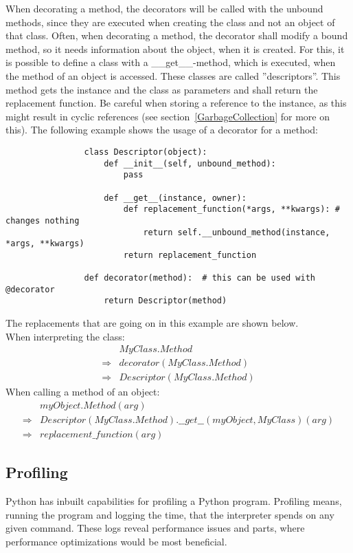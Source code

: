 			When decorating a method, the decorators will be called with the unbound methods, since they are executed when creating the class and not an object of that class.
			Often, when decorating a method, the decorator shall modify a bound method, so it needs information about the object, when it is created.
			For this, it is possible to define a class with a {\normalfont \ttfamily \_\_get\_\_}-method, which is executed, when the method of an object is accessed.
			These classes are called ''descriptors''.
			This method gets the instance and the class as parameters and shall return the replacement function.
			Be careful when storing a reference to the instance, as this might result in cyclic references (see section~\ref{GarbageCollection} for more on this).
			The following example shows the usage of a decorator for a method:
			\begin{verbatim}
				class Descriptor(object):
					def __init__(self, unbound_method):
						pass

					def __get__(instance, owner):
						def replacement_function(*args, **kwargs): # changes nothing
							return self.__unbound_method(instance, *args, **kwargs)
						return replacement_function

				def decorator(method):	# this can be used with @decorator
					return Descriptor(method)
			\end{verbatim}
			The replacements that are going on in this example are shown below.\\
			When interpreting the class:
			\begin{equation}
				\begin{aligned}
					            & MyClass.Method\\
					\Rightarrow & decorator(MyClass.Method)\\
					\Rightarrow & Descriptor(MyClass.Method)
				\end{aligned}
			\end{equation}
			When calling a method of an object:
			\begin{equation}
				\begin{aligned}
					            & myObject.Method(arg) \\
					\Rightarrow & Descriptor(MyClass.Method).\_\_get\_\_(myObject, MyClass)(arg) \\
					\Rightarrow & replacement\_function(arg)
				\end{aligned}
			\end{equation}

		\subsection{Profiling}
			Python has inbuilt capabilities for profiling a Python program.
			Profiling means, running the program and logging the time, that the interpreter spends on any given command.
			These logs reveal performance issues and parts, where performance optimizations would be most beneficial.

